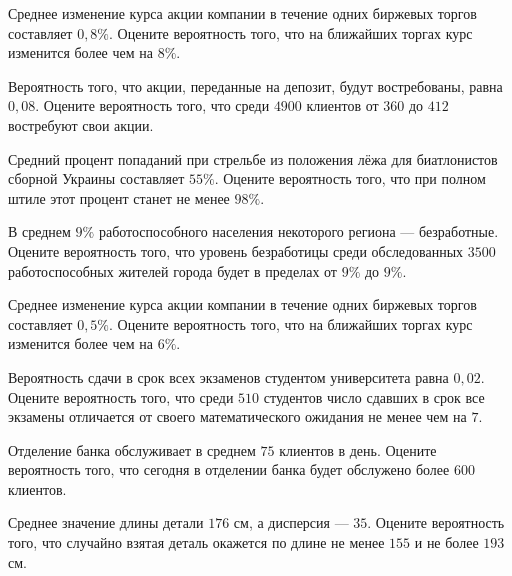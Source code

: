 \vfill

\newpage\setcounter{zad}{0}

\z Среднее изменение курса акции компании в течение одних биржевых торгов составляет $ 0{,}8 \% $. Оцените вероятность того, что на ближайших торгах курс изменится более чем на $ 8 \% $.


\vfill

\z Вероятность того, что акции, переданные на депозит, будут востребованы, равна $ 0{,}08 $. Оцените вероятность того, что среди $ 4900 $ клиентов от $ 360 $ до $ 412 $ востребуют свои акции.
 

\vfill

\newpage\setcounter{zad}{0}

\z Средний процент попаданий при стрельбе из положения лёжа для биатлонистов сборной Украины составляет $ 55 \% $. Оцените вероятность того, что при полном штиле этот процент станет не менее $ 98 \% $.


\vfill

\z В среднем $ 9 \% $ работоспособного населения некоторого региона --- безработные. Оцените вероятность того, что уровень безработицы среди обследованных $ 3500 $ работоспособных жителей города будет в пределах от $ 9 \%$ до $ 9 \%$.
 

\vfill

\newpage\setcounter{zad}{0}

\z Среднее изменение курса акции компании в течение одних биржевых торгов составляет $ 0{,}5 \% $. Оцените вероятность того, что на ближайших торгах курс изменится более чем на $ 6 \% $.


\vfill

\z Вероятность сдачи в срок всех экзаменов студентом университета равна $ 0{,}02 $. Оцените вероятность того, что среди $ 510 $ студентов число сдавших в срок все экзамены отличается от своего математического ожидания не менее чем на $ 7 $. 
 

\vfill

\newpage\setcounter{zad}{0}

\z Отделение банка обслуживает в среднем $ 75 $ клиентов в день. Оцените вероятность того, что сегодня в отделении банка будет обслужено более $ 600 $ клиентов.


\vfill

\z Среднее значение длины детали $ 176 $ см, а дисперсия --- $ 35 $. Оцените вероятность того, что случайно взятая деталь окажется по длине не менее $ 155 $ и не более $ 193 $ см.
 

\vfill

